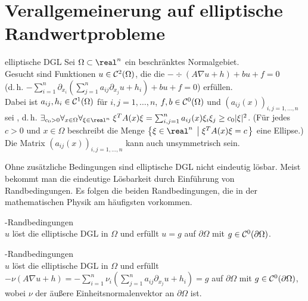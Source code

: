 \section{%
    Verallgemeinerung auf elliptische Randwertprobleme%
}

\begin{Def}{elliptische DGL}
    Sei $\Omega \subset \real^n$ ein beschränktes Normalgebiet.\\
    Gesucht sind Funktionen $u \in \mathcal{C}^2(\Omega)$, die die 
    $-\div(A \nabla u + h) + bu + f = 0$\\
    (d.\,h. $-\sum_{i=1}^n \partial_{x_i}
    \!\left(\sum_{j=1}^n a_{ij} \partial_{x_j} u + h_i\right) + bu + f = 0$)
    erfüllen.\\
    Dabei ist $a_{ij}, h_i \in \mathcal{C}^1(\Omega)$ für $i, j = 1, \dotsc, n$,
    $f, b \in \mathcal{C}^0(\Omega)$ und $(a_{ij}(x))_{i,j=1,\dotsc,n}$ sei
    , d.\,h.
    $\exists_{c_0 > 0} \forall_{x \in \Omega} \forall_{\xi \in \real^n}\;
    \xi^T A(x) \xi = \sum_{i,j=1}^n a_{ij}(x) \xi_i \xi_j \ge c_0 |\xi|^2$.
    (Für jedes $c > 0$ und $x \in \Omega$ beschreibt die Menge
    $\left\{\xi \in \real^n \;\left|\; \xi^T A(x) \xi = c\right.\right\}$
    eine Ellipse.)\\
    Die Matrix $(a_{ij}(x))_{i,j=1,\dotsc,n}$ kann auch unsymmetrisch sein.
\end{Def}

\begin{Bem}
    Ohne zusätzliche Bedingungen sind elliptische DGL nicht eindeutig lösbar.
    Meist bekommt man die eindeutige Lösbarkeit durch Einführung von Randbedingungen.
    Es folgen die beiden Randbedingungen, die in der mathematischen Physik am häufigsten
    vorkommen.
\end{Bem}

\begin{Def}{-Randbedingungen}\\
    $u$ löst die elliptische DGL in $\Omega$ und erfüllt
    $u = g$ auf $\partial\Omega$ mit $g \in \mathcal{C}^0(\partial\Omega)$.
\end{Def}

\begin{Def}{-Randbedingungen}\\
    $u$ löst die elliptische DGL in $\Omega$ und erfüllt
    $-\nu (A \nabla u + h) =
    -\sum_{i=1}^n \nu_i \left(\sum_{j=1}^n a_{ij} \partial_{x_j} u + h_i\right) = g$ auf
    $\partial\Omega$ mit $g \in \mathcal{C}^0(\partial\Omega)$, wobei $\nu$ der äußere
    Einheitsnormalenvektor an $\partial\Omega$ ist.
\end{Def}

